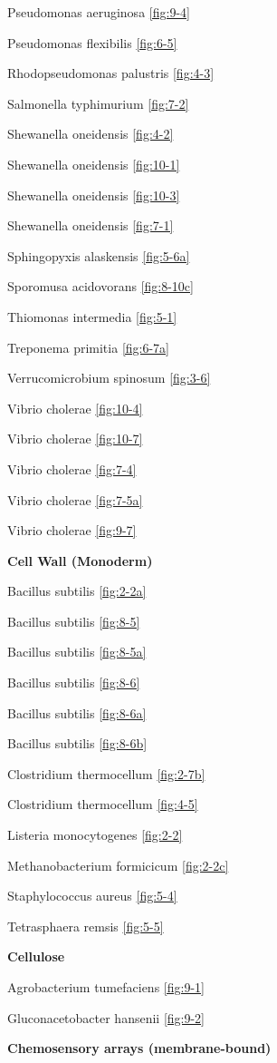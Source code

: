 \documentclass[]{tufte-book}
\begin{document}
Pseudomonas aeruginosa \ref{fig:9-4}

Pseudomonas flexibilis \ref{fig:6-5}

Rhodopseudomonas palustris \ref{fig:4-3}

Salmonella typhimurium \ref{fig:7-2}

Shewanella oneidensis \ref{fig:4-2}

Shewanella oneidensis \ref{fig:10-1}

Shewanella oneidensis \ref{fig:10-3}

Shewanella oneidensis \ref{fig:7-1}

Sphingopyxis alaskensis \ref{fig:5-6a}

Sporomusa acidovorans \ref{fig:8-10c}

Thiomonas intermedia \ref{fig:5-1}

Treponema primitia \ref{fig:6-7a}

Verrucomicrobium spinosum \ref{fig:3-6}

Vibrio cholerae \ref{fig:10-4}

Vibrio cholerae \ref{fig:10-7}

Vibrio cholerae \ref{fig:7-4}

Vibrio cholerae \ref{fig:7-5a}

Vibrio cholerae \ref{fig:9-7}

\textbf{Cell Wall (Monoderm)}

Bacillus subtilis \ref{fig:2-2a}

Bacillus subtilis \ref{fig:8-5}

Bacillus subtilis \ref{fig:8-5a}

Bacillus subtilis \ref{fig:8-6}

Bacillus subtilis \ref{fig:8-6a}

Bacillus subtilis \ref{fig:8-6b}

Clostridium thermocellum \ref{fig:2-7b}

Clostridium thermocellum \ref{fig:4-5}

Listeria monocytogenes \ref{fig:2-2}

Methanobacterium formicicum \ref{fig:2-2c}

Staphylococcus aureus \ref{fig:5-4}

Tetrasphaera remsis \ref{fig:5-5}

\textbf{Cellulose}

Agrobacterium tumefaciens \ref{fig:9-1}

Gluconacetobacter hansenii \ref{fig:9-2}

\textbf{Chemosensory arrays (membrane-bound)}
\end{document}
